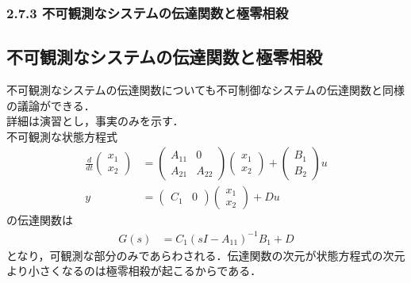 \begin{frame}[t]
\frametitle{2.7.3 不可観測なシステムの伝達関数と極零相殺}
\subsection{不可観測なシステムの伝達関数と極零相殺}

不可観測なシステムの伝達関数についても不可制御なシステムの伝達関数と同様の議論ができる．
\\[3mm]

詳細は演習とし，事実のみを示す．
\\[3mm]

不可観測な状態方程式
\begin{align}
 \frac{d}{dt}
  \left(\begin{array}{c}
         {x}_1 \\
	 {x}_2 
	\end{array}\right)
  &=
  \left(\begin{array}{cc}
         {A}_{11} & 0 \\
	     {A}_{21} & {A}_{22}
	\end{array}\right)
  \left(\begin{array}{c}
         {x}_1 \\
	 {x}_2 
	\end{array}\right)
  +
  \left(\begin{array}{c}
         {B}_1 \\
	 {B}_2
	\end{array}\right)
  u \\
 y &=
  \left(\begin{array}{cc}
         {C}_1 & 0
	\end{array}\right)
  \left(\begin{array}{c}
         {x}_1 \\
	 {x}_2 
	\end{array}\right)
  + D u
\end{align}
の伝達関数は
\begin{align}
	G(s) &= {C}_1 (sI - {A}_{11})^{-1} {B}_1 + D
\end{align}
となり，可観測な部分のみであらわされる．伝達関数の次元が状態方程式の次元より小さくなるのは極零相殺が起こるからである．
\end{frame}

